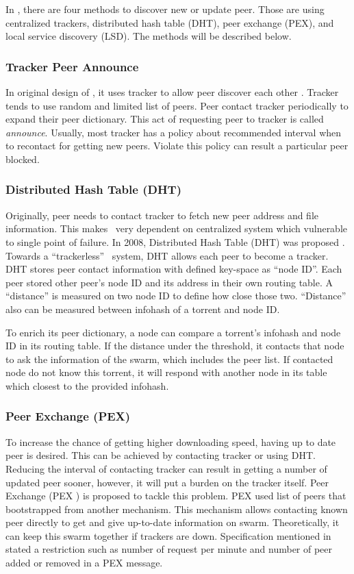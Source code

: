 In \bt, there are four methods to discover new or update peer. Those are using centralized trackers, distributed hash table (DHT), peer exchange (PEX), and local service discovery (LSD). The methods will be described below.

\subsubsection{Tracker Peer Announce}
In original design of \bt, it uses tracker to allow peer discover each other \cite{2003:bittorrent:cohen}. Tracker tends to use random and limited list of peers. Peer contact tracker periodically to expand their peer dictionary. This act of requesting peer to tracker is called \textit{announce}.	Usually, most tracker has a policy about recommended interval when to recontact for getting new peers. Violate this policy can result a particular peer blocked.	
	
\subsubsection{Distributed Hash Table (DHT)}
Originally, peer needs to contact tracker to fetch new peer address and file information. This makes \bt~very dependent on centralized system which vulnerable to single point of failure. In 2008, Distributed Hash Table (DHT) was proposed \cite{2008:dht:loewenstern}. Towards a ``trackerless'' \bt~system, DHT allows each peer to become a tracker. DHT stores peer contact information with defined key-space as ``node ID''. Each peer stored other peer's node ID and its address in their own routing table. A ``distance'' is measured on two node ID to define how close those two. ``Distance'' also can be measured between infohash of a torrent and node ID.
	
To enrich its peer dictionary, a node can compare a torrent's infohash and node ID in its routing table. If the distance under the threshold, it contacts that node to ask the information of the swarm, which includes the peer list. If contacted node do not know this torrent, it will respond with another node in its table which closest to the provided infohash. 

\subsubsection{Peer Exchange (PEX)}
To increase the chance of getting higher downloading speed, having up to date peer is desired. This can be achieved by contacting tracker or using DHT. Reducing the interval of contacting tracker can result in getting a number of updated peer sooner, however, it will put a burden on the tracker itself. Peer Exchange (PEX )\cite{2015:PEX:the8472} is proposed to tackle this problem. PEX used list of peers that bootstrapped from another mechanism. This mechanism allows contacting known peer directly to get and give up-to-date information on swarm. Theoretically, it can keep this swarm together if trackers are down. Specification mentioned in \cite{2015:PEX:the8472} stated a restriction such as number of request per minute and number of peer added or removed in a PEX message.
	
